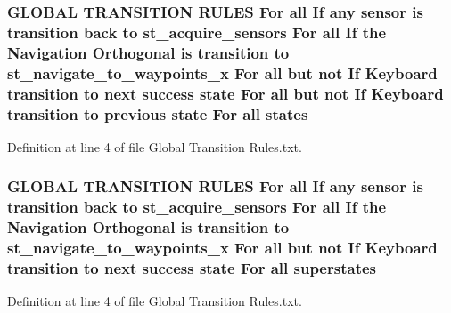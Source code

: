 \subsubsection[{\texorpdfstring{states}{states}}]{\setlength{\rightskip}{0pt plus 5cm}G\+L\+O\+B\+AL T\+R\+A\+N\+S\+I\+T\+I\+ON R\+U\+L\+ES For all If any sensor is transition back to st\+\_\+acquire\+\_\+sensors For all If the Navigation {\bf Orthogonal} is transition to st\+\_\+navigate\+\_\+to\+\_\+waypoints\+\_\+x For all but not If Keyboard transition to next success state For all but not If Keyboard transition to previous state For all states}\hypertarget{strikes__back_2docs_2Global_01Transition_01Rules_8txt_a54d1602740c77675ed14ebfe688f4374}{}\label{strikes__back_2docs_2Global_01Transition_01Rules_8txt_a54d1602740c77675ed14ebfe688f4374}


Definition at line 4 of file Global Transition Rules.\+txt.

\subsubsection[{\texorpdfstring{superstates}{superstates}}]{\setlength{\rightskip}{0pt plus 5cm}G\+L\+O\+B\+AL T\+R\+A\+N\+S\+I\+T\+I\+ON R\+U\+L\+ES For all If any sensor is transition back to st\+\_\+acquire\+\_\+sensors For all If the Navigation {\bf Orthogonal} is transition to st\+\_\+navigate\+\_\+to\+\_\+waypoints\+\_\+x For all but not If Keyboard transition to next success state For all superstates}\hypertarget{strikes__back_2docs_2Global_01Transition_01Rules_8txt_af31ae27f561335eed0d5161d8ee256f8}{}\label{strikes__back_2docs_2Global_01Transition_01Rules_8txt_af31ae27f561335eed0d5161d8ee256f8}


Definition at line 4 of file Global Transition Rules.\+txt.

